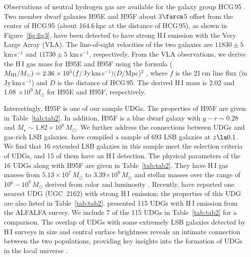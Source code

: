 \documentclass[twocolumn,trackchanges]{aastex61}
\begin{document}
Observations of neutral hydrogen gas are available for the galaxy group HCG\,95 \citep{Huchtmeier2000}. Two member dwarf galaxies  H95E and H95F about 3$\farcm$5 offset from the center of HCG\,95 (about 164.6\,kpc at the distance of HCG\,95), as shown in Figure~\ref{fig:fig3}, have been detected to have strong H\,{\small I} emission with the Very Large Array (VLA). The line-of-sight velocities of the two galaxies are $11830 \pm 5$ km\,s$^{-1}$ and  $11730 \pm 5$ km\,s$^{-1}$, respectively. From the VLA observations, we derive the H\,{\small I} gas mass for H95E and H95F using the formula ($M_{\rm HI}/M_{\odot}) = 2.36\times 10^{5} (f/$Jy\,km\,s$^{-1})(D$/Mpc)$^{2}$ \citep{Levy2007}, where $f$ is the 21\,cm line flux (in Jy\,km\,s$^{-1}$) and $D$ is the distance of HCG\,95. The derived H\,{\small I} mass is 2.02  and 1.08 $\times 10^{9}\,M_{\odot}$ for H95E and H95F, respectively. 

Interestingly, H95F is one of our sample UDGs. The properties of H95F are given in Table~\ref{tab:tab2}.  In addition, H95F is a blue dwarf galaxy with $ g-r \sim 0.28$ and $M_{\star}\sim 1.82\times10^{8}$\,$M_{\odot}$. We further address the connections between UDGs and gas-rich LSB galaxies.  \citet{Impey1996} have compiled a sample of 693 LSB galaxies at $z \la 0.1$. We find that 16 extended LSB galaxies in this sample meet the selection criteria of UDGs, and  15 of them have an H\,{\small I} detection. The physical parameters of the 16 UDGs along with H95F are given in Table~\ref{tab:tab2}. They have H\,{\small I} gas masses from $5.13\times 10^{7}$\,$M_{\odot}$ to 3.39$\times 10^{9}$\,$M_{\odot}$ and stellar masses over the range of 10$^{6} - 10^{8}$\,$M_{\odot}$ derived from color and luminosity \citep{Fukugita1996,Bell2003,Taylor2011}. Recently, \citet{Trujillo2017} have reported one nearest UDG (UGC~2162) with strong H\,{\small I} emission; the properties of this UDG are also listed in Table~\ref{tab:tab2}. \cite{Leisman2017} presented 115 UDGs with H\,{\small I} emission from the ALFALFA survey. We include 7 of the 115 UDGs in Table~\ref{tab:tab2} for a comparison. The overlap of UDGs with some extremely LSB galaxies detected by H\,{\small I} surveys in size and central surface brightness reveals an intimate connection between the two populations, providing key insights into the formation of UDGs in the local universe \citep{Bellazzini2017}. 
\end{document}
